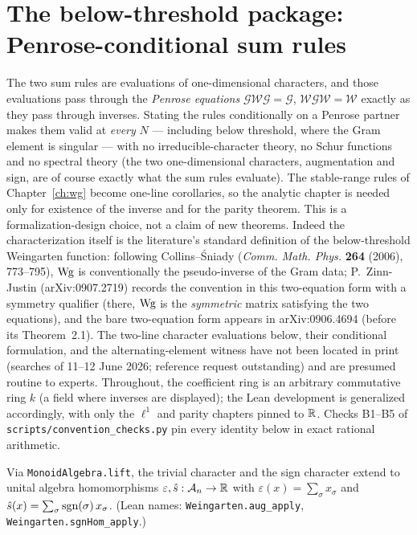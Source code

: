 \chapter{The below-threshold package: Penrose-conditional sum rules}\label{ch:below}

The two sum rules are evaluations of one-dimensional characters, and those
evaluations pass through the \emph{Penrose equations}
$\mathcal G\mathcal W\mathcal G=\mathcal G$,
$\mathcal W\mathcal G\mathcal W=\mathcal W$ exactly as they pass through
inverses. Stating the rules conditionally on a Penrose partner makes them
valid at \emph{every} $N$ --- including below threshold, where the Gram
element is singular --- with no irreducible-character theory, no Schur
functions and no spectral theory (the two one-dimensional characters,
augmentation and sign, are of course exactly what the sum rules
evaluate). The stable-range rules of Chapter~\ref{ch:wg} become
one-line corollaries, so the analytic chapter is needed only for existence
of the inverse and for the parity theorem. This is a formalization-design
choice, not a claim of new theorems. Indeed the characterization itself is
the literature's standard definition of the below-threshold Weingarten
function: following Collins--\'Sniady (\emph{Comm. Math. Phys.}
\textbf{264} (2006), 773--795), $\operatorname{Wg}$ is conventionally the pseudo-inverse
of the Gram data; P.~Zinn-Justin (arXiv:0907.2719) records the
convention in this two-equation form with a symmetry qualifier (there,
$\operatorname{Wg}$ is the \emph{symmetric} matrix satisfying the two equations), and
the bare two-equation form appears in arXiv:0906.4694 (before its
Theorem~2.1). The two-line character
evaluations below, their conditional formulation, and the
alternating-element witness have not been located in print (searches of
11--12 June 2026; reference request outstanding) and are presumed routine
to experts. Throughout, the coefficient ring is an arbitrary commutative
ring $k$ (a field where inverses are displayed); the Lean development is
generalized accordingly, with only the $\ell^1$ and parity chapters pinned
to $\mathbb{R}$. Checks B1--B5 of \texttt{scripts/convention\_checks.py} pin every
identity below in exact rational arithmetic.

\begin{lemma}\label{lem:hom_coeffsum}
\leanok
{}
Via \texttt{MonoidAlgebra.lift}, the trivial character and the sign
character extend to unital algebra homomorphisms
$\varepsilon,\hat s:\mathcal{A}_{n}\to\mathbb{R}$ with
$\varepsilon(x)=\sum_\sigma x_\sigma$ and
$\hat s(x)=\sum_\sigma\operatorname{sgn}(\sigma)\,x_\sigma$.
(Lean names: \texttt{Weingarten.aug\_apply},
\texttt{Weingarten.sgnHom\_apply}.)
\end{lemma}

